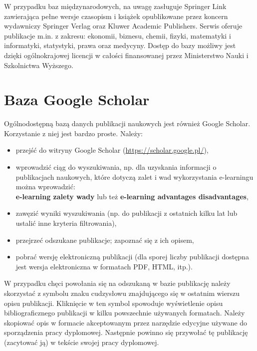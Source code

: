 W przypadku baz międzynarodowych, na uwagę zasługuje Springer Link zawierająca pełne wersje czasopism i książek opublikowane przez koncern wydawniczy Springer Verlag oraz Kluwer Academic Publishers. Serwis oferuje publikacje m.in. z zakresu: ekonomii, biznesu, chemii, fizyki, matematyki i informatyki, statystyki, prawa oraz medycyny. Dostęp do bazy możliwy jest dzięki ogólnokrajowej licencji w całości finansowanej przez Ministerstwo Nauki i Szkolnictwa Wyższego.



\section{Baza Google Scholar}

Ogólnodostępną bazą danych publikacji naukowych jest również Google Scholar. Korzystanie z niej jest bardzo proste. Należy:

\begin{itemize}
	
	\item przejść do witryny Google Scholar (\url{https://scholar.google.pl/}),
	
	\item wprowadzić ciąg do wyszukiwania, np. dla uzyskania informacji o publikacjach naukowych, które dotyczą zalet i wad wykorzystania e-learningu można wprowadzić:\\
	\textbf{e-learning zalety wady} lub też \textbf{e-learning advantages disadvantages},
	
	\item zawęzić wyniki wyszukiwania (np. do publikacji z ostatnich kilku lat lub ustalić inne kryteria filtrowania),
	
	\item przejrzeć odszukane publikacje; zapoznać się z ich opisem,
	
	\item pobrać wersję elektroniczną publikacji (dla sporej liczby publikacji dostępna jest wersja elektroniczna w formatach PDF, HTML, itp.).
	
\end{itemize}

W przypadku chęci powołania się na odszukaną w bazie publikację należy skorzystać z symbolu znaku cudzysłowu znajdującego się w ostatnim wierszu opisu publikacji. Kliknięcie w ten symbol spowoduje wyświetlenie opisu bibliograficznego publikacji w kilku powszechnie używanych formatach. Należy skopiować opis w formacie akceptowanym przez narzędzie edycyjne używane do sporządzenia pracy dyplomowej\footnotemark. Następnie powinno się przywołać tę publikację (zacytować ją) w tekście swojej pracy dyplomowej.


